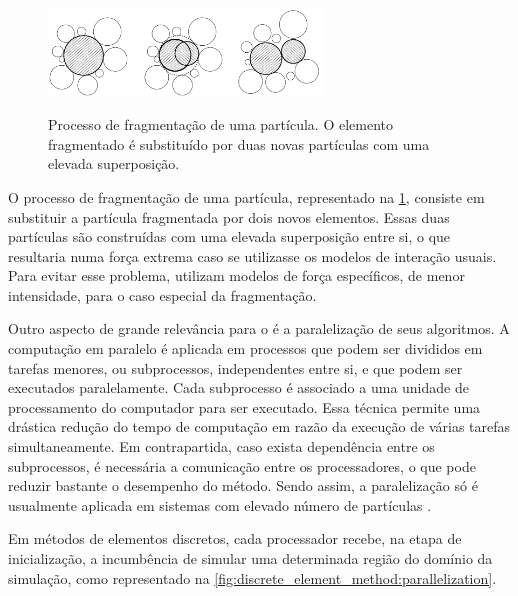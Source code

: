 \begin{figure}[h]
	\caption{Processo de fragmentação de uma partícula. O elemento fragmentado é substituído por duas novas partículas com uma elevada superposição.}
	\centering
		\includegraphics[width=0.65\textwidth]{images/discrete_element_method/fragmentation/particle_fragmentation_process}
	\label{fig:discrete_element_method:fragmentation}
\end{figure}

O processo de fragmentação de uma partícula, representado na \cref{fig:discrete_element_method:fragmentation}, consiste em substituir a partícula fragmentada por dois novos elementos. Essas duas partículas são construídas com uma elevada superposição entre si, o que resultaria numa força extrema caso se utilizasse os modelos de interação usuais. Para evitar esse problema, utilizam modelos de força específicos, de menor intensidade, para o caso especial da fragmentação.

Outro aspecto de grande relevância para o \DEM{} é a paralelização de seus algoritmos. A computação em paralelo é aplicada em processos que podem ser divididos em tarefas menores, ou subprocessos, independentes entre si, e que podem ser executados paralelamente. Cada subprocesso é associado a uma unidade de processamento do computador para ser executado. Essa técnica permite uma drástica redução do tempo de computação em razão da execução de várias tarefas simultaneamente. Em contrapartida, caso exista dependência entre os subprocessos, é necessária a comunicação entre os processadores, o que pode reduzir bastante o desempenho do método. Sendo assim, a paralelização só é usualmente aplicada em sistemas com elevado número de partículas \cite[p. 128]{bib:computational_granular_dynamics}.

Em métodos de elementos discretos, cada processador recebe, na etapa de inicialização, a incumbência de simular uma determinada região do domínio da simulação, como representado na \cref{fig:discrete_element_method:parallelization}.

